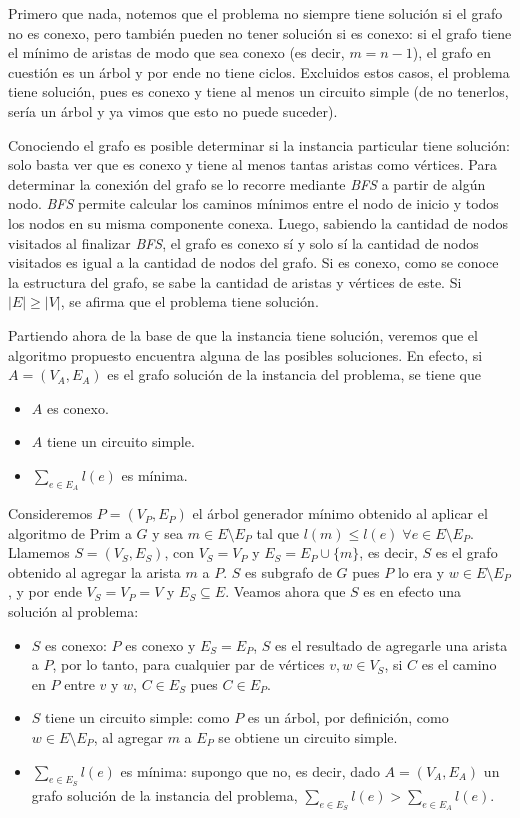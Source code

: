 Primero que nada, notemos que el problema no siempre tiene solución si el
grafo no es conexo, pero también pueden no tener solución si es conexo: si
el grafo tiene el mínimo de aristas de modo que sea conexo (es decir, $m = n
- 1$), el grafo en cuestión es un árbol y por ende no tiene ciclos.
Excluidos estos casos, el problema tiene solución, pues es conexo y tiene al
menos un circuito simple (de no tenerlos, sería un árbol y ya vimos que esto
no puede suceder).

Conociendo el grafo es posible determinar si la instancia particular tiene
solución: solo basta ver que es conexo y tiene al menos tantas aristas como
vértices. Para determinar la conexión del grafo se lo recorre mediante
\textit{BFS} a partir de algún nodo. \textit{BFS} permite calcular los
caminos mínimos entre el nodo de inicio y todos los nodos en su misma
componente conexa. Luego, sabiendo la cantidad de nodos visitados al
finalizar \textit{BFS}, el grafo es conexo sí y solo sí la cantidad de nodos
visitados es igual a la cantidad de nodos del grafo. Si es conexo, como se
conoce la estructura del grafo, se sabe la cantidad de aristas y vértices de
este. Si $|E| \geq |V|$, se afirma que el problema tiene solución.

Partiendo ahora de la base de que la instancia tiene solución, veremos
que el algoritmo propuesto encuentra alguna de las posibles soluciones. En
efecto, si $A = (V_A, E_A)$ es el grafo solución de la instancia del
problema, se tiene que

\begin{itemize}
  \item $A$ es conexo.
  \item $A$ tiene un circuito simple.
  \item $\sum\limits_{e \in E_A} l(e)$ es mínima.
\end{itemize}

Consideremos $P = (V_P, E_P)$ el árbol generador mínimo obtenido al aplicar
el algoritmo de Prim a $G$ y sea $m \in E \setminus E_P$ tal que $l(m) \leq
l(e) \; \forall e \in E \setminus E_P$. Llamemos $S = (V_S, E_S)$, con $V_S
= V_P$ y $E_S = E_P \cup \{m\}$, es decir, $S$ es el grafo obtenido al
agregar la arista $m$ a $P$. $S$ es subgrafo de $G$ pues $P$ lo era y $w \in
E \setminus E_P$, y por ende $V_S = V_P = V$ y $E_S \subseteq E$. Veamos
ahora que $S$ es en efecto una solución al problema:

\begin{itemize}
  \item $S$ es conexo: $P$ es conexo y $E_S = E_P$, $S$ es el resultado de
  agregarle una arista a $P$, por lo tanto, para cualquier par de vértices
  $v, w \in V_S$, si $C$ es el camino en $P$ entre $v$ y $w$, $C \in E_S$
  pues $C \in E_P$.
  \item $S$ tiene un circuito simple: como $P$ es un árbol, por definición,
  como $w \in E \setminus E_P$, al agregar $m$ a $E_P$ se obtiene un
  circuito simple.
  \item $\sum\limits_{e \in E_S} l(e)$ es mínima: supongo que no, es decir,
  dado $A = (V_A, E_A)$ un grafo solución de la instancia del problema,
  $\sum\limits_{e \in E_S} l(e) > \sum\limits_{e \in E_A} l(e)$.
\end{itemize}


